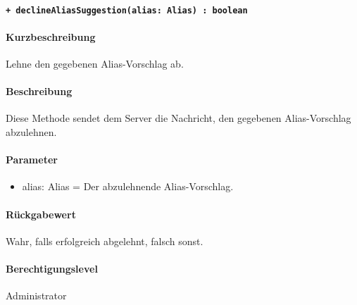 \paragraph{\texttt{+ declineAliasSuggestion(alias: Alias) : boolean}}%
\paragraph*{Kurzbeschreibung}
Lehne den gegebenen Alias-Vorschlag ab.
\paragraph*{Beschreibung}
Diese Methode sendet dem Server die Nachricht, den gegebenen Alias-Vorschlag abzulehnen.
\paragraph*{Parameter}
\begin{itemize}
    \item alias: Alias = Der abzulehnende Alias-Vorschlag.
\end{itemize}
\paragraph*{Rückgabewert}
Wahr, falls erfolgreich abgelehnt, falsch sonst.
\paragraph*{Berechtigungslevel}
Administrator